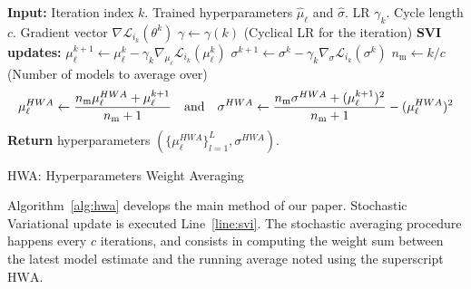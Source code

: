 \documentclass[tablecaption=bottom,wcp]{jmlr} %
\begin{document}
\begin{algorithm}[H]
\begin{algorithmic}[1]
\STATE \textbf{Input:} Iteration index $k$. Trained hyperparameters $\hat{\mu}_{\ell}$ and $\hat{\sigma}$. LR $\gamma_k$. Cycle length $c$. Gradient vector $\nabla \mathcal{L}_{i_{k}}(\theta^{k})$
\STATE $\gamma \leftarrow \gamma(k)$ (Cyclical LR for the iteration)
\STATE \textbf{SVI updates:}
\STATE \quad $\mu_{\ell}^{k+1} \leftarrow \mu_{\ell}^{k} - \gamma_k \nabla_{\mu_{\ell}} \mathcal{L}_{i_{k}}(\mu_{\ell}^{k})$  \label{line:svi}
\STATE \quad $\sigma^{k+1} \leftarrow \sigma^{k} - \gamma_k \nabla_{\sigma} \mathcal{L}_{i_{k}}(\sigma^{k})$ \label{line:svisigma}
	\STATE \quad $n_{\textrm{m}} \leftarrow k/c$ \quad (Number of models to average over)
\begin{equation}\notag
\mu_{\ell}^{HWA} \leftarrow \frac{n_{\textrm{m}}\mu_{\ell}^{HWA} + \mu_{\ell}^{k+1}}{n_{\textrm{m}}+1} \quad \textrm{and} \quad \sigma^{HWA} \leftarrow \frac{n_{\textrm{m}}\sigma^{HWA} + (\mu_{\ell}^{k+1})^2}{n_{\textrm{m}}+1} -( \mu_{\ell}^{HWA})^2
\end{equation}
\ENDIF
\STATE \textbf{Return} hyperparameters $(\{\mu_{\ell}^{HWA}\}_{l=1}^L, \sigma^{HWA})$.
\end{algorithmic}
\caption{HWA: Hyperparameters Weight Averaging}
\label{alg:hwa}
\end{algorithm}

Algorithm~\ref{alg:hwa} develops the main method of our paper.
Stochastic Variational update is executed Line~\ref{line:svi}.
The stochastic averaging procedure happens every $c$ iterations, and consists in computing the weight sum between the latest model estimate and the running average noted using the superscript $\textrm{HWA}$.
\end{document}
